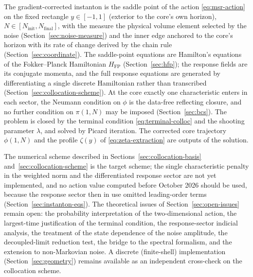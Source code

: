 \documentclass[a4paper,11pt]{article}
\newcommand{\Ny}{N}                          %
\newcommand{\Ninit}{N_{\mathrm{init}}}       %
\newcommand{\Nfinal}{N_{\mathrm{final}}}     %
\newcommand{\field}{\phi}                    %
\newcommand{\mom}{\pi}                       %
\newcommand{\yco}{y}                         %
\newcommand{\Hfp}{H_{\mathrm{FP}}}            %
\newcommand{\lag}{\lambda}                   %
\newcommand{\zprofile}{\zeta}                %
\begin{document}
The gradient-corrected instanton is the saddle point of the action
\eqref{eq:msr-action} on the fixed rectangle $\yco\in[-1,1]$
(exterior to the core's own horizon), $\Ny\in[\Ninit,\Nfinal]$, with the
measure the physical volume element selected by the noise
(Section~\ref{sec:noise-measure}) and the inner edge anchored to the
core's horizon with its rate of change derived by the chain rule
(Section~\ref{sec:coordinate}). The saddle-point equations are Hamilton's
equations of the Fokker--Planck Hamiltonian $\Hfp$
(Section~\ref{sec:hfp}); the response fields are its conjugate momenta,
and the full response equations are generated by differentiating a single
discrete Hamiltonian rather than transcribed
(Section~\ref{sec:collocation-scheme}). At the core exactly one
characteristic enters in each sector, the Neumann condition on $\field$ is
the data-free reflecting closure, and no further condition on
$\mom(1,\Ny)$ may be imposed (Section~\ref{sec:bcs}). The problem is
closed by the terminal condition \eqref{eq:terminal-colloc} and the
shooting parameter $\lag$, and solved by Picard iteration. The corrected
core trajectory $\field(1,\Ny)$ and the profile $\zprofile(\yco)$ of
\eqref{eq:zeta-extraction} are outputs of the solution.

The numerical scheme described in Sections~\ref{sec:collocation-basis}
and~\ref{sec:collocation-scheme} is the target scheme; the single
characteristic penalty in the weighted norm and the differentiated
response sector are not yet implemented, and no action value computed
before October 2026 should be used, because the response sector then in
use omitted leading-order terms (Section~\ref{sec:instanton-eqs}).
The theoretical issues of Section~\ref{sec:open-issues} remain open: the
probability interpretation of the two-dimensional action, the largest-time
justification of the terminal condition, the response-sector indicial
analysis, the treatment of the state dependence of the noise amplitude,
the decoupled-limit reduction test, the bridge to the spectral formalism,
and the extension to non-Markovian noise. A discrete (finite-shell)
implementation (Section~\ref{sec:geometry}) remains available as an
independent cross-check on the collocation scheme.
\end{document}
